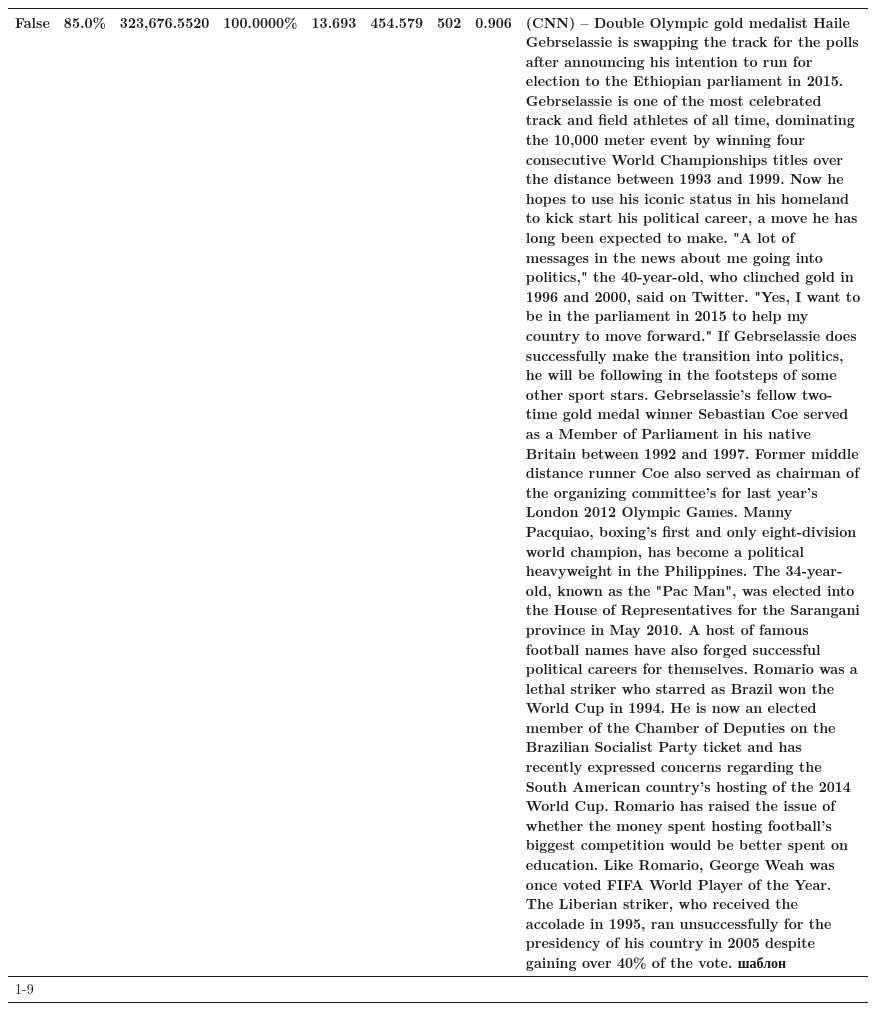 \begin{table}[H]
{\begin{tabular}{lllrlllll}
False & 85.0\% & 323,676.5520 & \bfseries \color{red} 100.0000\% & 13.693 & 454.579 & 502 & 0.906 & (CNN) -- Double Olympic gold medalist Haile Gebrselassie is swapping the track for the polls after announcing his intention to run for election to the Ethiopian parliament in 2015. Gebrselassie is one of the most celebrated track and field athletes of all time, dominating the 10,000 meter event by winning four consecutive World Championships titles over the distance between 1993 and 1999. Now he hopes to use his iconic status in his homeland to kick start his political career, a move he has long been expected to make. "A lot of messages in the news about me going into politics," the 40-year-old, who clinched gold in 1996 and 2000, said on Twitter. "Yes, I want to be in the parliament in 2015 to help my country to move forward." If Gebrselassie does successfully make the transition into politics, he will be following in the footsteps of some other sport stars. Gebrselassie's fellow two-time gold medal winner Sebastian Coe served as a Member of Parliament in his native Britain between 1992 and 1997. Former middle distance runner Coe also served as chairman of the organizing committee's for last year's London 2012 Olympic Games. Manny Pacquiao, boxing's first and only eight-division world champion, has become a political heavyweight in the Philippines. The 34-year-old, known as the "Pac Man", was elected into the House of Representatives for the Sarangani province in May 2010. A host of famous football names have also forged successful political careers for themselves. Romario was a lethal striker who starred as Brazil won the World Cup in 1994. He is now an elected member of the Chamber of Deputies on the Brazilian Socialist Party ticket and has recently expressed concerns regarding the South American country's hosting of the 2014 World Cup. Romario has raised the issue of whether the money spent hosting football's biggest competition would be better spent on education. Like Romario, George Weah was once voted FIFA World Player of the Year. The Liberian striker, who received the accolade in 1995, ran unsuccessfully for the presidency of his country in 2005 despite gaining over 40\% of the vote. шаблон \\
\cline{1-9}

\end{tabular}}
\end{table}
